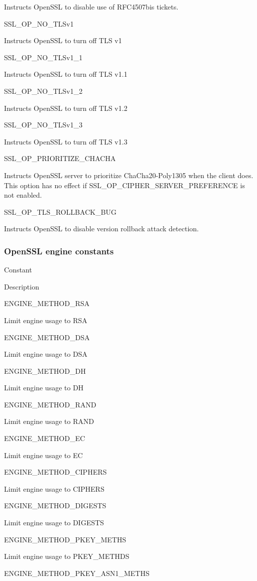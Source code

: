 Instructs OpenSSL to disable use of RFC4507bis tickets.

SSL\_OP\_NO\_TLSv1

Instructs OpenSSL to turn off TLS v1

SSL\_OP\_NO\_TLSv1\_1

Instructs OpenSSL to turn off TLS v1.1

SSL\_OP\_NO\_TLSv1\_2

Instructs OpenSSL to turn off TLS v1.2

SSL\_OP\_NO\_TLSv1\_3

Instructs OpenSSL to turn off TLS v1.3

SSL\_OP\_PRIORITIZE\_CHACHA

Instructs OpenSSL server to prioritize ChaCha20-Poly1305 when the client
does. This option has no effect if SSL\_OP\_CIPHER\_SERVER\_PREFERENCE
is not enabled.

SSL\_OP\_TLS\_ROLLBACK\_BUG

Instructs OpenSSL to disable version rollback attack detection.

\subsubsection{OpenSSL engine constants}\label{openssl-engine-constants}

Constant

Description

ENGINE\_METHOD\_RSA

Limit engine usage to RSA

ENGINE\_METHOD\_DSA

Limit engine usage to DSA

ENGINE\_METHOD\_DH

Limit engine usage to DH

ENGINE\_METHOD\_RAND

Limit engine usage to RAND

ENGINE\_METHOD\_EC

Limit engine usage to EC

ENGINE\_METHOD\_CIPHERS

Limit engine usage to CIPHERS

ENGINE\_METHOD\_DIGESTS

Limit engine usage to DIGESTS

ENGINE\_METHOD\_PKEY\_METHS

Limit engine usage to PKEY\_METHDS

ENGINE\_METHOD\_PKEY\_ASN1\_METHS

